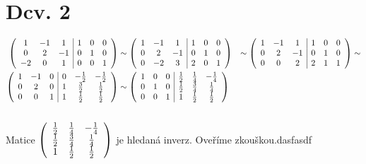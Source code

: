 \documentclass[a4paper]{article}
\author{Hynek Kydlicek}
\title{}
\begin{document}
\maketitle
\section{Dcv. 2}
\begin{align*}
\left(
\begin{array}{ c c c | c c c }
    1 & -1 & 1 & 1 & 0 & 0\\
    0 & 2 & -1 & 0 & 1 & 0\\
    -2 & 0 & 1 & 0 & 0 & 1
\end{array}
\right)
&\sim
\left(
\begin{array}{ c c c | c c c }
    1 & -1 & 1 & 1 & 0 & 0\\
    0 & 2 & -1 & 0 & 1 & 0\\
    0 & -2 & 3 & 2 & 0 & 1
\end{array}
\right)
&\sim
\left(
\begin{array}{ c c c | c c c }
    1 & -1 & 1 & 1 & 0 & 0\\
    0 & 2 & -1 & 0 & 1 & 0\\
    0 & 0 & 2 & 2 & 1 & 1
\end{array}
\right)
&\sim
\\
\left(
\begin{array}{ c c c | c c c }
    1 & -1 & 0 & 0 & -\frac{1}{2} & -\frac{1}{2}\\
    0 & 2 & 0 & 1 & \frac{3}{2} & \frac{1}{2}\\
    0 & 0 & 1 & 1 & \frac{1}{2} & \frac{1}{2}
\end{array}
\right)
&\sim
\left(
\begin{array}{ c c c | c c c }
    1 & 0 & 0 & \frac{1}{2} & \frac{1}{4} & -\frac{1}{4}\\
    0 & 1 & 0 & \frac{1}{2} & \frac{3}{4} & \frac{1}{4}\\
    0 & 0 & 1 & 1 & \frac{1}{2} & \frac{1}{2}
\end{array}
\right)
\end{align*}
\\
Matice 
$
\left(
\begin{array}{ c c c }
     \frac{1}{2} & \frac{1}{4} & -\frac{1}{4}\\
     \frac{1}{2} & \frac{3}{4} & \frac{1}{4}\\
     1 & \frac{1}{2} & \frac{1}{2}
\end{array}
\right)
$
je hledaná inverz.
Oveříme zkouškou.dasfasdf
\end{document}
